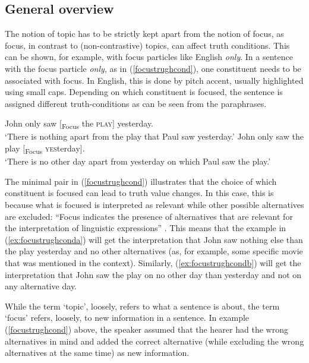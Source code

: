 \subsection{General overview}
\label{finersplitsfocus}
The notion of topic has to be strictly kept apart from the notion of focus, as focus, in contrast to (non-contrastive) topics, can affect truth conditions. This can be shown, for example, with focus particles like English \textit{only}. In a sentence with the focus particle \textit{only}, as in (\ref{focustrughcond}), one constituent needs to be associated with focus. In English, this is done by pitch accent, usually highlighted using small caps. Depending on which constituent is focused, the sentence is assigned different truth-conditions as can be seen from the paraphrases. %



\begin{exe}
\ex\label{focustrughcond}
\begin{xlist} 
\ex John only saw $[$\textsubscript{Focus} the \textsc{play}$]$ yesterday. \\
`There is nothing apart from the play that Paul saw yesterday.'\label{ex:focustrughconda}
\ex John only saw the play $[$\textsubscript{Focus} \textsc{yes}terday$]$. \\
`There is no other day apart from yesterday on which Paul saw the play.'\label{ex:focustrughcondb}
\end{xlist}
\end{exe}

\noindent The minimal pair in (\ref{focustrughcond}) illustrates that the choice of which constituent is focused can lead to truth value changes. In this case, this is because what is focused is interpreted as relevant while other possible alternatives are excluded: ``Focus indicates the presence of alternatives that are relevant for the interpretation of linguistic expressions'' \citep[18]{krifka2007basic}. This means that the example in (\ref{ex:focustrughconda}) will get the interpretation that John saw nothing else than the play yesterday and no other alternatives (as, for example, some specific movie that was mentioned in the context). Similarly, (\ref{ex:focustrughcondb}) will get the interpretation that John saw the play on no other day than yesterday and not on any alternative day. 

While the term `topic', loosely, refers to what a sentence is about, the term `focus' refers, loosely, to new information in a sentence. In example (\ref{focustrughcond}) above, the speaker assumed that the hearer had the wrong alternatives in mind and added the correct alternative (while excluding the wrong alternatives at the same time) as new information. 

